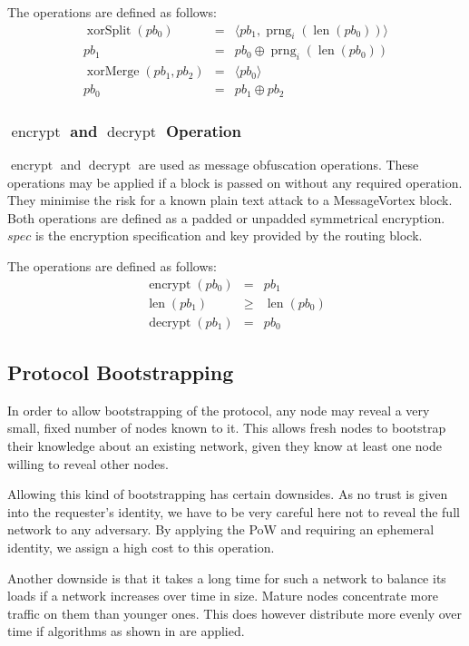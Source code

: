 \documentclass[9pt,journal,compsoc]{IEEEtran}
\DeclareMathOperator{\prng}{prng}
\DeclareMathOperator{\len}{len}
\DeclareMathOperator{\xorSplit}{xorSplit}
\DeclareMathOperator{\xorMerge}{xorMerge}
\DeclareMathOperator{\encrypt}{encrypt}
\DeclareMathOperator{\decrypt}{decrypt}
\begin{document}
The operations are defined as follows:
\begin{eqnarray}
\xorSplit(pb_0) & = &\langle pb_1, \prng_i(\len(pb_0)) \rangle\\
pb_1 & = & pb_0 \oplus \prng_i(\len(pb_0))\\
\xorMerge(pb_1,pb_2) & = &\langle pb_0 \rangle\\
pb_0 & = & pb_1 \oplus pb_2
\end{eqnarray}

\subsubsection{$\encrypt$ and $\decrypt$ Operation}
$\encrypt$ and $\decrypt$ are used as message obfuscation operations. These operations may be applied if a block is passed on without any required operation. They minimise the risk for a known plain text attack to a MessageVortex block. Both operations are defined as a padded or unpadded symmetrical encryption. $spec$ is the encryption specification and key provided by the routing block.

The operations are defined as follows:
\begin{eqnarray}
\encrypt(pb_0) & = & pb_1 \\
\len(pb_1) & \geq & \len(pb_0)\\
\decrypt(pb_1) & = & pb_0
\end{eqnarray}

\subsection{Protocol Bootstrapping}
In order to allow bootstrapping of the protocol, any node may reveal a very small, fixed number of nodes known to it. This allows fresh nodes to bootstrap their knowledge about an existing network, given they know at least one node willing to reveal other nodes. 

Allowing this kind of bootstrapping has certain downsides. As no trust is given into the requester's identity, we have to be very careful here not to reveal the full network to any adversary. By applying the PoW and requiring an ephemeral identity, we assign a high cost to this operation. 

Another downside is that it takes a long time for such a network to balance its loads if a network increases over time in size. Mature nodes concentrate more traffic on them than younger ones. This does however distribute more evenly over time if algorithms as shown in \cite{messageVortex} are applied.
\end{document}
